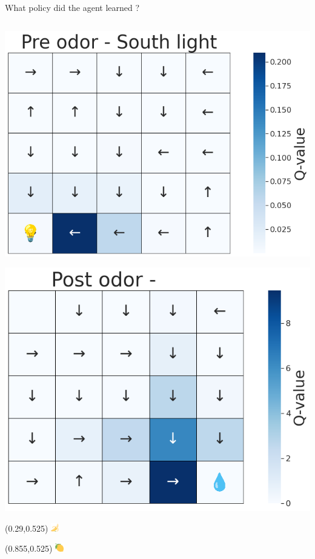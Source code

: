 \documentclass[bigger]{beamer}
\begin{document}
\begin{frame}[label={sec:orgd3d4019}]{What policy did the agent learned ?}
\begin{columns}
\begin{column}[t]{0.5\columnwidth}
\begin{center}
\includegraphics[height=0.4\textheight]{img/policy-allo-south-light.png}
\end{center}
\begin{center}
\includegraphics[height=0.4\textheight]{img/policy-allo-odor-B.png}
\end{center}
\begin{textblock}{0.2}(0.29,0.525)%
\includegraphics[height=1em]{img/banana.png}
\end{textblock}
\begin{textblock}{0.2}(0.855,0.525)%
\includegraphics[height=1em]{img/lemon.png}
\end{textblock}
\end{column}
\end{columns}
\end{frame}
\end{document}
